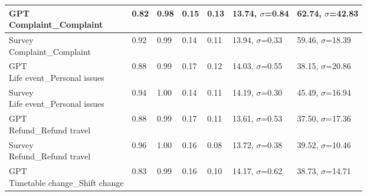 \begin{table}[h]
{\begin{tabular}{|l|l|l|l|l|l|l|}
    \shortstack[l]{GPT\\Complaint\_Complaint}                                         & 0.82                          & 0.98                         & 0.15                              & 0.13                              & 13.74, $\sigma$=0.84               & 62.74, $\sigma$=42.83          \\ \hline
    \shortstack[l]{Survey\\Complaint\_Complaint}                                      & 0.92                          & 0.99                         & 0.14                              & 0.11                              & 13.94, $\sigma$=0.33               & 59.46, $\sigma$=18.39          \\ \hline
    \shortstack[l]{GPT\\Life event\_Personal issues}                                  & 0.88                          & 0.99                         & 0.17                              & 0.12                              & 14.03, $\sigma$=0.55               & 38.15, $\sigma$=20.86          \\ \hline
    \shortstack[l]{Survey\\Life event\_Personal issues}                               & 0.94                          & 1.00                         & 0.14                              & 0.11                              & 14.19, $\sigma$=0.30               & 45.49, $\sigma$=16.94          \\ \hline
    \shortstack[l]{GPT\\Refund\_Refund travel}                                        & 0.88                          & 0.99                         & 0.17                              & 0.11                              & 13.61, $\sigma$=0.53               & 37.50, $\sigma$=17.36          \\ \hline
    \shortstack[l]{Survey\\Refund\_Refund travel}                                     & 0.96                          & 1.00                         & 0.16                              & 0.08                              & 13.72, $\sigma$=0.38               & 39.52, $\sigma$=10.46          \\ \hline
    \shortstack[l]{GPT\\Timetable change\_Shift change}                               & 0.83                          & 0.99                         & 0.16                              & 0.10                              & 14.17, $\sigma$=0.62               & 38.73, $\sigma$=14.71          \\ \hline

\end{tabular}}
\end{table}
